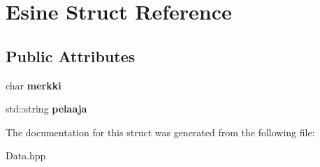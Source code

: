 \hypertarget{struct_esine}{}\section{Esine Struct Reference}
\label{struct_esine}
\subsection*{Public Attributes}
\begin{DoxyCompactItemize}
\item 
\hypertarget{struct_esine_a8fc000d89cd0926b864c6242b9b51192}{}char {\bfseries merkki}\label{struct_esine_a8fc000d89cd0926b864c6242b9b51192}

\item 
\hypertarget{struct_esine_acbd8cbb1e704ecb09c75004ae29ad45f}{}std\+::string {\bfseries pelaaja}\label{struct_esine_acbd8cbb1e704ecb09c75004ae29ad45f}

\end{DoxyCompactItemize}


The documentation for this struct was generated from the following file\+:\begin{DoxyCompactItemize}
\item 
Data.\+hpp\end{DoxyCompactItemize}
